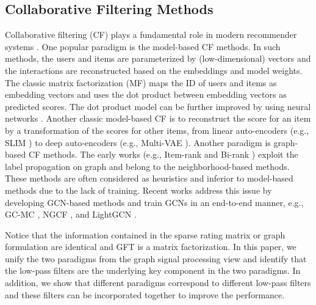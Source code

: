 \documentclass[sigconf]{acmart}
\begin{document}
\subsection{Collaborative Filtering Methods}
Collaborative filtering (CF) plays a fundamental role in modern recommender systems \cite{covington2016deep}. One popular paradigm is the model-based CF methods. In such methods, the users and items are parameterized by (low-dimensional) vectors and the interactions are reconstructed based on the embeddings and model weights. The classic matrix factorization (MF) maps the ID of users and items as embedding vectors and uses the dot product between embedding vectors as predicted scores. The dot product model can be further improved by using neural networks \cite{he2017neural,tay2018latent}. Another classic model-based CF is to reconstruct the score for an item by a transformation of the scores for other items, from linear auto-encoders (e.g., SLIM \cite{ning2011slim}) to deep auto-encoders (e.g., Multi-VAE \cite{liang2018variational}). Another paradigm is graph-based CF methods. The early works (e.g., Item-rank \cite{gori2007itemrank} and Bi-rank \cite{he2016birank}) exploit the label propagation on graph and belong to the neighborhood-based methods. These methods are often considered as heuristics and inferior to model-based methods due to the lack of training. Recent works address this issue by developing GCN-based methods and train GCNs in an end-to-end manner, e.g., GC-MC \cite{berg2017graph}, NGCF \cite{wang2019neural}, and LightGCN \cite{he2020lightgcn}. 

Notice that the information contained in the sparse rating matrix or graph formulation are identical and GFT is a matrix factorization. In this paper, we unify the two paradigms from the graph signal processing view and identify that the low-pass filters are the underlying key component in the two paradigms. In addition, we show that different paradigms correspond to different low-pass filters and these filters can be incorporated together to improve the performance.
\end{document}
